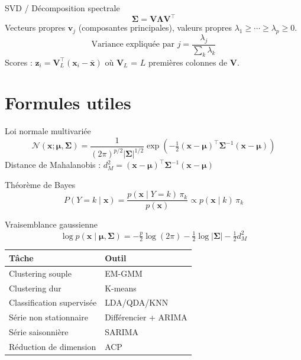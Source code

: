 \documentclass[10pt,a4paper,twocolumn]{article}
\newcommand{\T}{^{\!\top}}   %
\begin{document}
\begin{formulebox}{SVD / Décomposition spectrale}
\[
\bm{\Sigma} = \mathbf{V}\bm{\Lambda}\mathbf{V}\T
\]
Vecteurs propres $\mathbf{v}_j$ (composantes principales), valeurs propres $\lambda_1 \geq \cdots \geq \lambda_p \geq 0$.
\[
\text{Variance expliquée par } j = \frac{\lambda_j}{\sum_k \lambda_k}
\]
Scores : $\mathbf{z}_i = \mathbf{V}_L\T(\mathbf{x}_i - \bar{\mathbf{x}})$ où $\mathbf{V}_L$ = $L$ premières colonnes de $\mathbf{V}$.
\end{formulebox}

\section{Formules utiles}

\begin{formulebox}{Loi normale multivariée}
\[
\mathcal{N}(\mathbf{x};\bm{\mu},\bm{\Sigma}) = \frac{1}{(2\pi)^{p/2}|\bm{\Sigma}|^{1/2}}
\exp\!\left(-\tfrac{1}{2}(\mathbf{x}-\bm{\mu})\T\bm{\Sigma}^{-1}(\mathbf{x}-\bm{\mu})\right)
\]
Distance de Mahalanobis : $d_M^2 = (\mathbf{x}-\bm{\mu})\T\bm{\Sigma}^{-1}(\mathbf{x}-\bm{\mu})$
\end{formulebox}

\begin{formulebox}{Théorème de Bayes}
\[
P(Y=k\mid\mathbf{x}) = \frac{p(\mathbf{x}\mid Y=k)\,\pi_k}{p(\mathbf{x})} \propto p(\mathbf{x}\mid k)\,\pi_k
\]
\end{formulebox}

\begin{formulebox}{Vraisemblance gaussienne}
\[
\log p(\mathbf{x}\mid\bm{\mu},\bm{\Sigma}) = -\tfrac{p}{2}\log(2\pi) - \tfrac{1}{2}\log|\bm{\Sigma}| - \tfrac{1}{2}d_M^2
\]
\end{formulebox}

\vspace{4pt}
\begin{tcolorbox}[colback=myblue!10,colframe=myblue,fonttitle=\bfseries\small,title=Mémo rapide]
\begin{tabular}{@{}ll@{}}
\toprule
Tâche & Outil \\
\midrule
Clustering souple & EM-GMM \\
Clustering dur & K-means \\
Classification supervisée & LDA/QDA/KNN \\
Série non stationnaire & Différencier + ARIMA \\
Série saisonnière & SARIMA \\
Réduction de dimension & ACP \\
\bottomrule
\end{tabular}
\end{tcolorbox}
\end{document}
